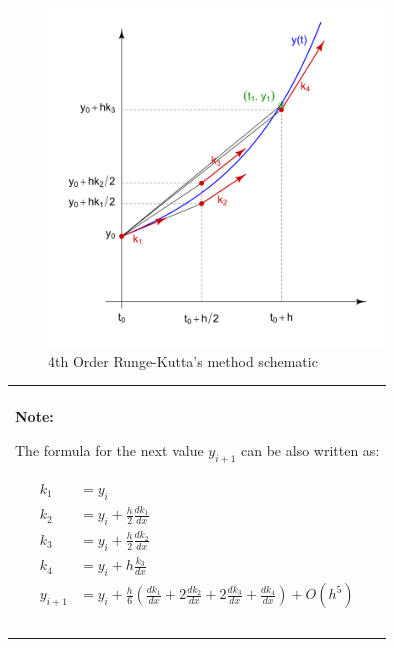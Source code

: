 \documentclass[10pt,b5paper,titlepage]{book}
\newenvironment{bbox}[1][1.0]
{
    \begin{center}
        \begin{tabular}{|p{#1\textwidth}|}
            \hline\\
}
{
            \\\\\hline
        \end{tabular}
    \end{center}
}
\newenvironment{ematrix}
{
    \begin{eqnarray}
        \begin{aligned}
}
{
        \end{aligned}
    \end{eqnarray}
}
\begin{document}
\begin{figure}[ht]
    \centering
    \includegraphics[width=0.80\textwidth]{img/Runge-Kutta_slopes.png}
    \caption{4th Order Runge-Kutta's method schematic}
    \label{fig:rk4-schema-png}
\end{figure}

\newpage
\begin{bbox}[0.96]
\textbf{Note:}

The formula for the next value $ y_{i+1} $ can be also written as:

\begin{ematrix}
    k_1 &= y_i\\
    k_2 &= y_i + \frac{h}{2} \frac{d k_1}{dx}\\
    k_3 &= y_i + \frac{h}{2} \frac{d k_2}{dx}\\
    k_4 &= y_i + h \frac{k_3}{dx}\\
    y_{i+1} &= y_i + \frac{h}{6} (\frac{d k_1}{dx} + 2 \frac{d k_2}{dx}
                              + 2 \frac{d k_3}{dx} + \frac{d k_4}{dx}) + O(h^5)
\end{ematrix}
\end{bbox}
\end{document}
